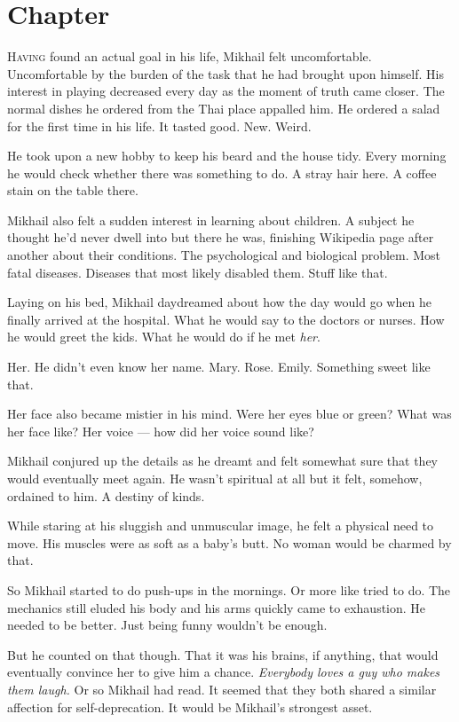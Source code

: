 \chapter{Chapter \thechapter}

\lettrine[lraise=0.1, nindent=0.1em, slope=-.5em]{H}{aving} found an actual goal in his life, Mikhail felt uncomfortable. Uncomfortable by the burden of the task that he had brought upon himself. His interest in playing decreased every day as the moment of truth came closer. The normal dishes he ordered from the Thai place appalled him. He ordered a salad for the first time in his life. It tasted good. New. Weird.

He took upon a new hobby to keep his beard and the house tidy. Every morning he would check whether there was something to do. A stray hair here. A coffee stain on the table there.

Mikhail also felt a sudden interest in learning about children. A subject he thought he’d never dwell into but there he was, finishing Wikipedia page after another about their conditions. The psychological and biological problem. Most fatal diseases. Diseases that most likely disabled them. Stuff like that.

Laying on his bed, Mikhail daydreamed about how the day would go when he finally arrived at the hospital. What he would say to the doctors or nurses. How he would greet the kids. What he would do if he met \textit{her}.

Her. He didn’t even know her name. Mary. Rose. Emily. Something sweet like that.

Her face also became mistier in his mind. Were her eyes blue or green? What was her face like? Her voice — how did her voice sound like?

Mikhail conjured up the details as he dreamt and felt somewhat sure that they would eventually meet again. He wasn’t spiritual at all but it felt, somehow, ordained to him. A destiny of kinds.

While staring at his sluggish and unmuscular image, he felt a physical need to move. His muscles were as soft as a baby's butt. No woman would be charmed by that.

So Mikhail started to do push-ups in the mornings. Or more like tried to do. The mechanics still eluded his body and his arms quickly came to exhaustion. He needed to be better. Just being funny wouldn’t be enough.

But he counted on that though. That it was his brains, if anything, that would eventually convince her to give him a chance. \textit{Everybody loves a guy who makes them laugh.} Or so Mikhail had read. It seemed that they both shared a similar affection for self-deprecation. It would be Mikhail’s strongest asset.


